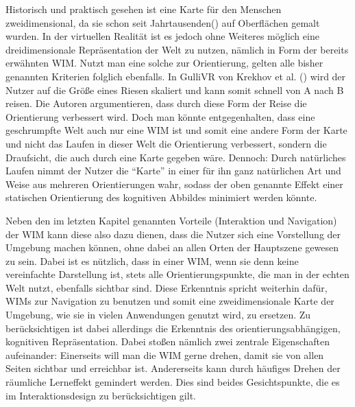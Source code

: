 Historisch und praktisch gesehen ist eine Karte für den Menschen zweidimensional, da sie schon seit Jahrtausenden(\cite{meece_2006}) auf Oberflächen gemalt wurden. 
In der virtuellen Realität ist es jedoch ohne Weiteres möglich eine dreidimensionale Repräsentation der Welt zu nutzen, nämlich in Form der bereits erwähnten WIM.
Nutzt man eine solche zur Orientierung, gelten alle bisher genannten Kriterien folglich ebenfalls.
In GulliVR von Krekhov et al. (\cite{Krekhov2018GulliVR}) wird der Nutzer auf die Größe eines Riesen skaliert und kann somit schnell von A nach B reisen. Die Autoren argumentieren, dass durch diese Form der Reise die Orientierung verbessert wird. Doch man könnte entgegenhalten, dass eine geschrumpfte Welt auch nur eine WIM ist und somit eine andere Form der Karte und nicht das Laufen in dieser Welt die Orientierung verbessert, sondern die Draufsicht, die auch durch eine Karte gegeben wäre.
Dennoch: Durch natürliches Laufen nimmt der Nutzer die “Karte” in einer für ihn ganz natürlichen Art und Weise aus mehreren Orientierungen wahr, sodass der oben genannte Effekt einer statischen Orientierung des kognitiven Abbildes minimiert werden könnte.

Neben den im letzten Kapitel genannten Vorteile (Interaktion und Navigation) der WIM kann diese also dazu dienen, dass die Nutzer sich eine Vorstellung der Umgebung machen können, ohne dabei an allen Orten der Hauptszene gewesen zu sein. Dabei ist es nützlich, dass in einer WIM, wenn sie denn keine vereinfachte Darstellung ist, stets alle Orientierungspunkte, die man in der echten Welt nutzt, ebenfalls sichtbar sind.
Diese Erkenntnis spricht weiterhin dafür, WIMs zur Navigation zu benutzen und somit eine zweidimensionale Karte der Umgebung, wie sie in vielen Anwendungen genutzt wird, zu ersetzen.
Zu berücksichtigen ist dabei allerdings die Erkenntnis des orientierungsabhängigen, kognitiven Repräsentation. Dabei stoßen nämlich zwei zentrale Eigenschaften aufeinander: Einerseits will man die WIM gerne drehen, damit sie von allen Seiten sichtbar und erreichbar ist. Andererseits kann durch häufiges Drehen der räumliche Lerneffekt gemindert werden. Dies sind beides Gesichtspunkte, die es im Interaktionsdesign zu berücksichtigen gilt.